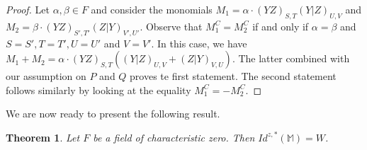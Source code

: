 \documentclass[11pt]{amsart}
\newtheorem{theorem}{Theorem}[section]
\theoremstyle{definition}
\theoremstyle{remark}
\begin{document}
\begin{proof}
  Let $\alpha, \beta \in F$ and consider the monomials 
$M_1=\alpha\cdot (YZ)_{S,T}(Y|Z)_{U, V}$ and $M_2=\beta\cdot  (YZ)_{S', T'}(Z|Y)_{V', U'}$. Observe that $M_1^C=M_2^C$ if and only if $\alpha=\beta$ and $S=S', T=T', U=U'$ and $V=V'$. In this case, we have $M_1+M_2=\alpha\cdot (YZ)_{S, T}((Y|Z)_{U, V}+(Z|Y)_{V, U})$. The latter combined with our assumption on $P$ and $Q$ proves te first statement. The second statement follows similarly by looking at the equality $M_1^C=-M_2^C$.
\end{proof}


We are now ready to present the following result.

\begin{theorem}\label{thm:main2}
    Let $F$ be a field of characteristic zero. Then  $Id^{z,*}(\mathbb M)=W$.
\end{theorem}
\end{document}
